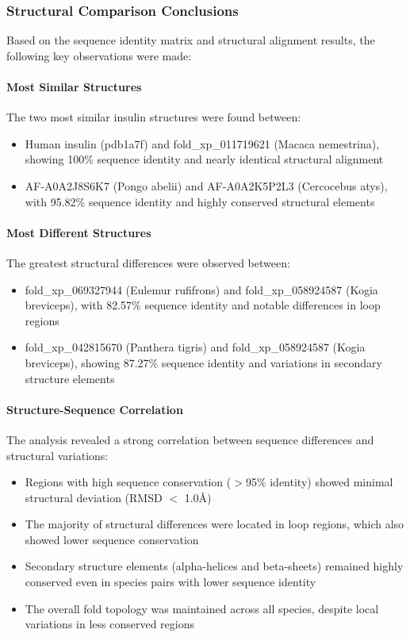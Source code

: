 \documentclass[11pt, a4paper, hidelinks]{article}
\begin{document}
\subsubsection{Structural Comparison Conclusions}\label{subsubsec:conclusions}

Based on the sequence identity matrix and structural alignment results, the following key observations were made:

\paragraph{Most Similar Structures} The two most similar insulin structures were found between:
\begin{itemize}
    \item Human insulin (pdb1a7f) and fold\_xp\_011719621 (Macaca nemestrina), showing 100\% sequence identity and nearly identical structural alignment
    \item AF-A0A2J8S6K7 (Pongo abelii) and AF-A0A2K5P2L3 (Cercocebus atys), with 95.82\% sequence identity and highly conserved structural elements
\end{itemize}

\paragraph{Most Different Structures} The greatest structural differences were observed between:
\begin{itemize}
    \item fold\_xp\_069327944 (Eulemur rufifrons) and fold\_xp\_058924587 (Kogia breviceps), with 82.57\% sequence identity and notable differences in loop regions
    \item fold\_xp\_042815670 (Panthera tigris) and fold\_xp\_058924587 (Kogia breviceps), showing 87.27\% sequence identity and variations in secondary structure elements
\end{itemize}

\paragraph{Structure-Sequence Correlation} The analysis revealed a strong correlation between sequence differences and structural variations:
\begin{itemize}
    \item Regions with high sequence conservation ($>$95\% identity) showed minimal structural deviation (RMSD $<$ 1.0\AA)
    \item The majority of structural differences were located in loop regions, which also showed lower sequence conservation
    \item Secondary structure elements (alpha-helices and beta-sheets) remained highly conserved even in species pairs with lower sequence identity
    \item The overall fold topology was maintained across all species, despite local variations in less conserved regions
\end{itemize}
\end{document}
